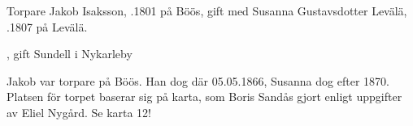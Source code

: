 Torpare Jakob Isaksson, .1801 på Böös, gift med Susanna Gustavsdotter Levälä, .1807 på Levälä.
\begin{jhchildren}
  \item {}, gift Sundell i Nykarleby
  \item {}
  \item {}
  \item {}
\end{jhchildren}
Jakob var torpare på Böös. Han dog där 05.05.1866, Susanna dog efter 1870. Platsen för torpet baserar sig på karta, som Boris Sandås gjort enligt uppgifter av Eliel Nygård. Se karta 12!

